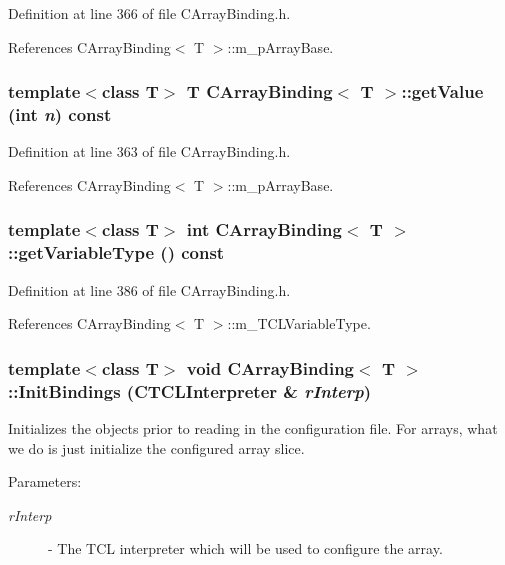 Definition at line 366 of file CArray\-Binding.h.

References CArray\-Binding$<$ T $>$::m\_\-p\-Array\-Base.
\subsubsection{\setlength{\rightskip}{0pt plus 5cm}template$<$class T$>$ T CArray\-Binding$<$ T $>$::get\-Value (int {\em n}) const\hspace{0.3cm}{\tt  [inline]}}\label{classCArrayBinding_a3}




Definition at line 363 of file CArray\-Binding.h.

References CArray\-Binding$<$ T $>$::m\_\-p\-Array\-Base.
\subsubsection{\setlength{\rightskip}{0pt plus 5cm}template$<$class T$>$ int CArray\-Binding$<$ T $>$::get\-Variable\-Type () const\hspace{0.3cm}{\tt  [inline]}}\label{classCArrayBinding_a9}




Definition at line 386 of file CArray\-Binding.h.

References CArray\-Binding$<$ T $>$::m\_\-TCLVariable\-Type.
\subsubsection{\setlength{\rightskip}{0pt plus 5cm}template$<$class T$>$ void CArray\-Binding$<$ T $>$::Init\-Bindings ({\bf CTCLInterpreter} \& {\em r\-Interp})\hspace{0.3cm}{\tt  [virtual]}}\label{classCArrayBinding_a10}


Initializes the objects prior to reading in the  configuration file. For arrays, what we do is just initialize the configured array slice.\begin{Desc}
\item[Parameters: ]\par
\begin{description}
\item[{\em 
r\-Interp}]- The TCL interpreter which will be used to configure the array. \end{description}
\end{Desc}


